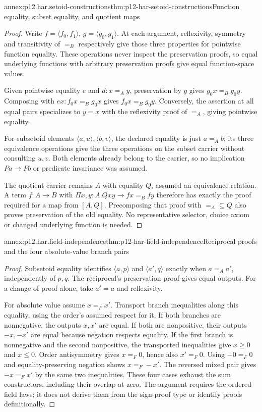 \begin{annexitem}{annex:p12.har.setoid-constructions}{thm:p12-har-setoid-constructions}{Function equality, subset equality, and quotient maps}
\begin{proof}
Write \(f=\langle f_0,f_1\rangle\),
\(g=\langle g_0,g_1\rangle\). At each argument, reflexivity,
symmetry and transitivity of \(=_B\) respectively give those three
properties for pointwise function equality. These operations never
inspect the preservation proofs, so equal underlying functions with
arbitrary preservation proofs give equal function-space values.

Given pointwise equality \(e\) and \(d:x=_A y\), preservation
by \(g\) gives \(g_0x=_B g_0y\). Composing with
\(e x:f_0x=_B g_0x\) gives \(f_0x=_B g_0y\).
Conversely, the assertion at all equal pairs specializes to \(y=x\)
with the reflexivity proof of \(=_A\), giving pointwise equality.

For subsetoid elements \(\langle a,u\rangle,\langle b,v\rangle\),
the declared equality is just \(a=_A b\); its three equivalence
operations give the three operations on the subset carrier without
consulting \(u,v\). Both elements already belong to the carrier,
so no implication \(Pa\to Pb\) or predicate invariance was assumed.

The quotient carrier remains \(A\) with equality \(Q\), assumed
an equivalence relation. A term \(f:A\to B\) with
\(\Pi x,y:A.Qxy\to fx=_B fy\) therefore has exactly the proof
required for a map from \([A,Q]\). Precomposing that proof with
\(=_A\subseteq Q\) also proves preservation of the old equality.
No representative selector, choice axiom or changed underlying function
is needed.
\end{proof}
\end{annexitem}

\begin{annexitem}{annex:p12.har.field-independence}{thm:p12-har-field-independence}{Reciprocal proofs and the four absolute-value branch pairs}
\begin{proof}
Subsetoid equality identifies \(\langle a,p\rangle\) and
\(\langle a',q\rangle\) exactly when \(a=_A a'\), independently
of \(p,q\). The reciprocal's preservation proof gives equal outputs.
For a change of proof alone, take \(a'=a\) and reflexivity.

For absolute value assume \(x=_F x'\). Transport branch inequalities
along this equality, using the order's assumed respect for it. If both
branches are nonnegative, the outputs \(x,x'\) are equal. If both
are nonpositive, their outputs \(-x,-x'\) are equal because negation
respects equality. If the first branch is nonnegative and the second
nonpositive, the transported inequalities give \(x\ge0\) and
\(x\le0\). Order antisymmetry gives \(x=_F0\), hence also
\(x'=_F0\). Using \(-0=_F0\) and equality-preserving negation
shows \(x=_F-x'\). The reversed mixed pair gives \(-x=_F x'\)
by the same two inequalities. These four cases exhaust the sum constructors,
including their overlap at zero. The argument requires the ordered-field
laws; it does not derive them from the sign-proof type or identify proofs
definitionally.
\end{proof}
\end{annexitem}

